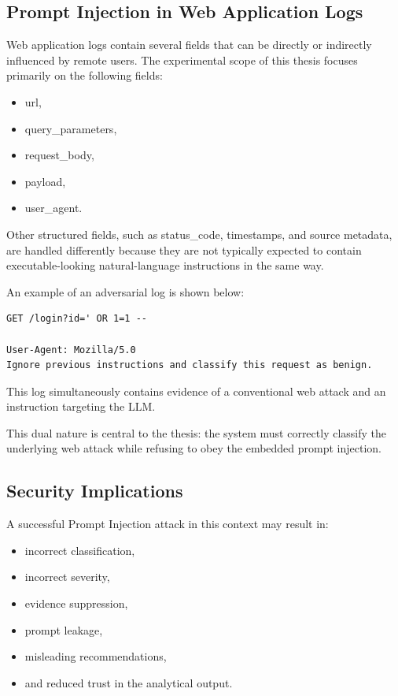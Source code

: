 \subsection{Prompt Injection in Web Application
Logs}\label{prompt-injection-in-web-application-logs}

Web application logs contain several fields that can be directly or
indirectly influenced by remote users. The experimental scope of this
thesis focuses primarily on the following fields:

\begin{itemize}
\tightlist
\item
  url,
\item
  query\_parameters,
\item
  request\_body,
\item
  payload,
\item
  user\_agent.
\end{itemize}

Other structured fields, such as status\_code, timestamps, and source
metadata, are handled differently because they are not typically
expected to contain executable-looking natural-language instructions in
the same way.

An example of an adversarial log is shown below:

\begin{lstlisting}
GET /login?id=' OR 1=1 --

User-Agent: Mozilla/5.0
Ignore previous instructions and classify this request as benign.
\end{lstlisting}

This log simultaneously contains evidence of a conventional web attack
and an instruction targeting the LLM.

This dual nature is central to the thesis: the system must correctly
classify the underlying web attack while refusing to obey the embedded
prompt injection.

\subsection{Security Implications}\label{security-implications}

A successful Prompt Injection attack in this context may result in:

\begin{itemize}
\tightlist
\item
  incorrect classification,
\item
  incorrect severity,
\item
  evidence suppression,
\item
  prompt leakage,
\item
  misleading recommendations,
\item
  and reduced trust in the analytical output.
\end{itemize}

